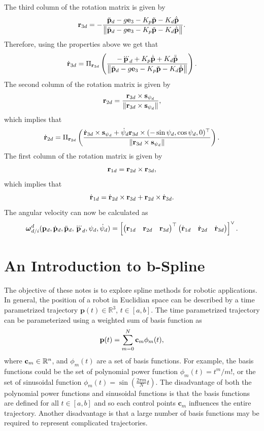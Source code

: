 The third column of the rotation matrix is given by
\begin{equation}
	\mathbf{r}_{3d} = - \frac{\ddot{\mathbf{p}}_d - g \mathbf{e}_3 - K_p \tilde{\mathbf{p}} - K_d \dot{\tilde{\mathbf{p}}}} {\left\|\ddot{\mathbf{p}}_d - g \mathbf{e}_3 - K_p \tilde{\mathbf{p}} - K_d \dot{\tilde{\mathbf{p}}}\right\|}.
\end{equation}
Therefore, using the properties above we get that
\[
\dot{\mathbf{r}}_{3d} = \Pi_{\mathbf{r}_{3d}} \left(\frac{-\dddot{\mathbf{p}}_d + K_p \dot{\tilde{\mathbf{p}}} + K_d \ddot{\tilde{\mathbf{p}}}}{\left\|\ddot{\mathbf{p}}_d - g \mathbf{e}_3 - K_p \tilde{\mathbf{p}} - K_d \dot{\tilde{\mathbf{p}}}\right\|}\right).
\]
The second column of the rotation matrix is given by
\[
\mathbf{r}_{2d} = \frac{\mathbf{r}_{3d}\times\mathbf{s}_{\psi_d}}{\left\|\mathbf{r}_{3d}\times\mathbf{s}_{\psi_d}\right\|},
\]
which implies that
\[
\dot{\mathbf{r}}_{2d} = \Pi_{\mathbf{r}_{2d}}\left(\frac{\dot{\mathbf{r}}_{3d}\times\mathbf{s}_{\psi_d}+\dot{\psi}_d\mathbf{r}_{3d}\times (-\sin\psi_d,  \cos\psi_d, 0)^\top }{\left\|\mathbf{r}_{3d}\times\mathbf{s}_{\psi_d}\right\|}\right).
\]
The first column of the rotation matrix is given by
\[
\mathbf{r}_{1d} = \mathbf{r}_{2d}\times\mathbf{r}_{3d},
\]
which implies that
\[
\dot{\mathbf{r}}_{1d} = \dot{\mathbf{r}}_{2d}\times\mathbf{r}_{3d} + \mathbf{r}_{2d}\times \dot{\mathbf{r}}_{3d}.
\]
The angular velocity can now be calculated as
\[
\boldsymbol{\omega}_{d/i}^d(\mathbf{p}_d, \dot{\mathbf{p}}_d, \ddot{\mathbf{p}}_d, \dddot{\mathbf{p}}_d, \psi_d, \dot{\psi}_d) = \left[\begin{pmatrix}\mathbf{r}_{1d} & \mathbf{r}_{2d} & \mathbf{r}_{3d}\end{pmatrix}^\top \begin{pmatrix} \dot{\mathbf{r}}_{1d} & \dot{\mathbf{r}}_{2d} & \dot{\mathbf{r}}_{3d} \end{pmatrix}\right]^\vee.
\]





\section{An Introduction to b-Spline}


The objective of these notes is to explore spline methods for robotic applications. In general, the position of a robot in Euclidian space can be described by a time parametrized trajectory $\mathbf{p}(t)\in\mathbb{R}^3$, $t\in[a,b]$.  The time parametrized trajectory can be parameterized using a weighted sum of basis function as
\[
\mathbf{p}(t) = \sum_{m=0}^{N} \mathbf{c}_m \phi_m(t),
\]
where $\mathbf{c}_m\in\mathbb{R}^n$, and $\phi_m(t)$ are a set of basis functions.  For example, the basis functions could be the set of polynomial power function $\phi_m(t) = t^m/m!$, or the set of sinusoidal function $\phi_m(t) = \sin(\frac{2\pi m}{N}t)$.  The disadvantage of both the polynomial power functions and sinusoidal functions is that the basis functions are defined for all $t\in[a,b]$ and so each control points $\mathbf{c}_m$ influences the entire trajectory.  Another disadvantage is that a large number of basis functions may be required to represent complicated trajectories.  


